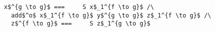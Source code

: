 \begin{figure}[!t]
  \centering
  \begin{minipage}{\columnwidth}
    \begin{lstlisting}[frame=tb]
  x$^{g \to g}$ ===     S x$_1^{f \to g}$ /\
  add$^o$ x$_1^{f \to g}$ y$^{g \to g}$ z$_1^{f \to g}$ /\
  z$^{f \to g}$ ===     S z$_1^{g \to g}$
    \end{lstlisting}
  \end{minipage}
\end{figure}
